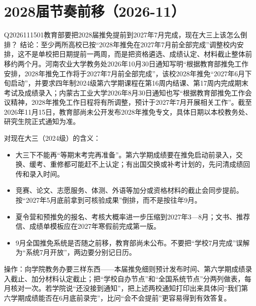 \section{2028届节奏前移（2026-11）}

\begin{qa}{Q2026111501}{教育部要把2028届推免提前到2027年7月完成，现在大三上该怎么倒排？}
结论：至少两所高校已按“2028年推免在2027年7月前全部完成”调整校内安排，这不是单校把日期提前一两周，而是把资格遴选、成绩认定、材料截止整体前移约两个月。河南农业大学教务处2026年10月30日通知写明“根据教育部推免工作安排，2028年推免工作将于2027年7月前全部完成”，该校2028年推免“2027年6月下旬启动”，并要求四年制2024级第六学期课程在第16周内结课、第17周内完成期末考试及成绩录入；内蒙古工业大学2026年8月30日通知也写“根据教育部推免工作会议精神，2028年推免工作日程将有所调整，预计于2027年7月开展相关工作”。截至2026年11月15日，教育部尚未公开发布2028年推免专文，具体日期以本校教务处、研究生院正式通知为准。

对现在大三（2024级）的含义：

\begin{itemize}
\item 大三下不能再“等期末考完再准备”。第六学期成绩要在推免启动前录入，交换、缓考、重修都可能赶不上认定；有出国交换或补考计划的，先问清成绩回传和录入时间。
\item 竞赛、论文、志愿服务、体测、外语等加分或资格材料的截止会同步提前。按“2027年5月底前拿到可核验成果”倒排，而不是按往年9月。
\item 夏令营和预推免的报名、考核大概率进一步压缩到2027年3—8月；文书、推荐信、成绩单模板应在2027年寒假前完成第一版。
\item 9月全国推免系统是否随之前移，教育部尚未公布。不要把“学校7月完成”误解为“系统7月开放”，两边要分别记日历。
\end{itemize}

操作：向学院教务办要三样东西——本届推免细则预计发布时间、第六学期成绩录入截止、加分材料认定截止；把“学校自办节点”和“全国系统节点”分两列做表，每月核对一次。若学院说“还没接到通知”，把上述两校通知打印出来具体问“我们第六学期成绩能否在6月底前录完”，比问“会不会提前”更容易得到有效答复。
\end{qa}

